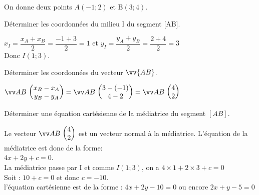 \documentclass[11pt,a4paper]{article}  %
\begin{document}
\exerciceDS{} %
On donne deux points $A(-1 ; 2)$ et $\mathrm{B}(3 ; 4)$.
\begin{enumMet}
	\item Déterminer les coordonnées du milieu I du segment [AB].
	\begin{corrBox}
		$x_I=\dfrac{x_A+x_B}{2}=\dfrac{-1+3}{2}=1$ et $y_I=\dfrac{y_A+y_B}{2}=\dfrac{2+4}{2}=3$\\
		Donc $I(1;3)$.
	\end{corrBox}
	\item Déterminer les coordonnées du vecteur $\vv{A B}$.
	\begin{corrBox}
		$\Coord{AB}{x_B-x_A}{y_B-y_A}=\Coord{AB}{3-(-1)}{4-2}=\Coord{AB}{4}{2}$
	\end{corrBox}
	\item Déterminer une équation cartésienne de la médiatrice du segment $[A B]$.
	\begin{corrBox}
		Le vecteur $\Coord{AB}{4}{2}$ est un vecteur normal à la médiatrice. L'équation de la médiatrice est donc de la forme:\\
		$4x+2y+c=0$.\\
		La médiatrice passe par I et comme $I(1 ; 3)$, on a $4\times1+2\times3+c=0$\\
		Soit : $10+c=0$ et donc $c=-10$.\\
		l'équation cartésienne est de la forme : $4x+2y-10=0$ ou encore $2x+y-5=0$
	\end{corrBox}
\end{enumMet}
\end{document}
